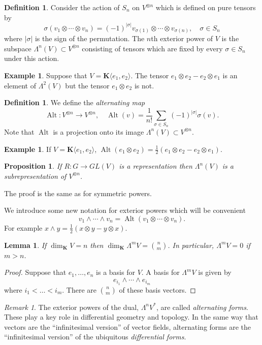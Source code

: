 \documentclass[12pt]{article}
\newcommand{\KK}{\mathbf{K}}
\newcommand{\OP}{\operatorname}
\newtheorem{lma}[thm]{Lemma}
\newtheorem{prp}[thm]{Proposition}
\theoremstyle{definition}
\newtheorem{dfn}[thm]{Definition}
\newtheorem{exm}[thm]{Example}
\theoremstyle{check}
\theoremstyle{remark}
\newtheorem{rmk}[thm]{Remark}
\theoremstyle{TheoremNum}
\begin{document}
\begin{dfn}
Consider the action of $S_n$ on $V^{\otimes n}$ which is defined on pure tensors by
\[\sigma(v_1\otimes\cdots\otimes v_n)=(-1)^{|\sigma|}v_{\sigma(1)}\otimes\cdots\otimes v_{\sigma(n)},\quad\sigma\in S_n\]
where $|\sigma|$ is the sign of the permutation. The $n$th exterior power of $V$ is the subspace $\Lambda^n(V)\subset V^{\otimes n}$ consisting of tensors which are fixed by every $\sigma\in S_n$ under this action.
\end{dfn}
\begin{exm}
Suppose that $V=\KK\langle e_1,e_2\rangle$. The tensor $e_1\otimes e_2-e_2\otimes e_1$ is an element of $\Lambda^2(V)$ but the tensor $e_1\otimes e_2$ is not.
\end{exm}
\begin{dfn}
We define the {\em alternating map}
\[\OP{Alt}\colon V^{\otimes n}\to V^{\otimes n},\quad\OP{Alt}(v)=\frac{1}{n!}\sum_{\sigma\in S_n}(-1)^{|\sigma|}\sigma(v).\]
Note that $\OP{Alt}$ is a projection onto its image $\Lambda^n(V)\subset V^{\otimes n}$.
\end{dfn}
\begin{exm}
If $V=\KK\langle e_1,e_2\rangle$, $\OP{Alt}(e_1\otimes e_2)=\frac{1}{2}(e_1\otimes e_2-e_2\otimes e_1)$.
\end{exm}
\begin{prp}
If $R\colon G\to GL(V)$ is a representation then $\Lambda^n(V)$ is a subrepresentation of $V^{\otimes n}$.
\end{prp}
The proof is the same as for symmetric powers.

We introduce some new notation for exterior powers which will be convenient
\[v_1\wedge\cdots\wedge v_n=\OP{Alt}(v_1\otimes\cdots\otimes v_n).\]
For example $x\wedge y=\frac{1}{2}(x\otimes y-y\otimes x)$. 

\begin{lma}\label{lma-exterior}
If $\dim_{\KK}V=n$ then $\dim_{\KK}\Lambda^mV=\binom{n}{m}$. In particular, $\Lambda^mV=0$ if $m>n$.
\end{lma}
\begin{proof}
Suppose that $e_1,\ldots,e_n$ is a basis for $V$. A basis for $\Lambda^mV$ is given by
\[e_{i_1}\wedge\cdots\wedge e_{i_m}\]
where $i_1<\ldots<i_m$. There are $\binom{n}{m}$ of these basis vectors.
\end{proof}

\begin{rmk}
The exterior powers of the dual, $\Lambda^nV^*$, are called {\em alternating forms}. These play a key role in differential geometry and topology. In the same way that vectors are the ``infinitesimal version'' of vector fields, alternating forms are the ``infinitesimal version'' of the ubiquitous {\em differential forms}.
\end{rmk}
\end{document}
